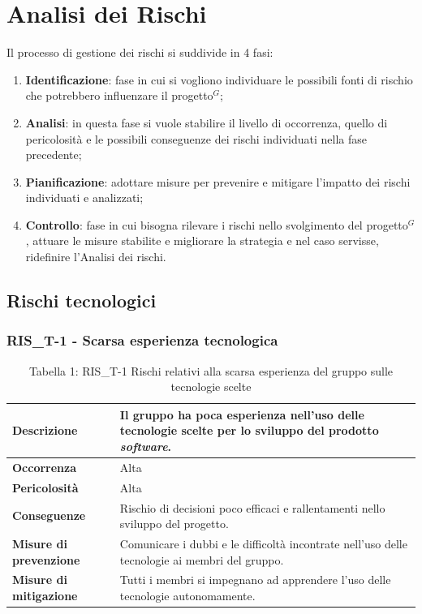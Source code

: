 \documentclass[a4paper,10pt]{article}
\begin{document}
\section{Analisi dei Rischi}
Il processo di gestione dei rischi si suddivide in 4 fasi:
\begin{enumerate}
  \item \textbf{Identificazione}: fase in cui si vogliono individuare le possibili fonti di rischio che potrebbero influenzare il progetto$^G$;
  \item \textbf{Analisi}: in questa fase si vuole stabilire il livello di occorrenza, quello di pericolosità e le possibili conseguenze dei rischi individuati nella fase precedente;
  \item \textbf{Pianificazione}: adottare misure per prevenire e mitigare l'impatto dei rischi individuati e analizzati;
  \item \textbf{Controllo}: fase in cui bisogna rilevare i rischi nello svolgimento del progetto$^G$, attuare le misure stabilite e migliorare la strategia e nel caso servisse, ridefinire l'Analisi dei rischi.
\end{enumerate}
\subsection{Rischi tecnologici}
\subsubsection{RIS\_T-1 - Scarsa esperienza tecnologica}

\begin{table}[H]
\centering
\renewcommand{\arraystretch}{1.3}

\begin{tabularx}{\textwidth}{|p{4cm}|X|}
\hline
\textbf{Descrizione} & 
Il gruppo ha poca esperienza nell’uso delle tecnologie scelte per lo sviluppo del prodotto \textit{software}. \\ \hline

\textbf{Occorrenza} & Alta \\ \hline

\textbf{Pericolosità} & Alta \\ \hline

\textbf{Conseguenze} & 
Rischio di decisioni poco efficaci e rallentamenti nello sviluppo del progetto. \\ \hline

\textbf{Misure di prevenzione} & Comunicare i dubbi e le difficoltà incontrate nell’uso delle tecnologie ai membri del gruppo. \\ \hline

\textbf{Misure di mitigazione} &
Tutti i membri si impegnano ad apprendere l’uso delle tecnologie autonomamente. \\ \hline

\end{tabularx}

\caption{Tabella 1: RIS\_T-1 Rischi relativi alla scarsa esperienza del gruppo sulle tecnologie scelte}
\end{table}
\end{document}
